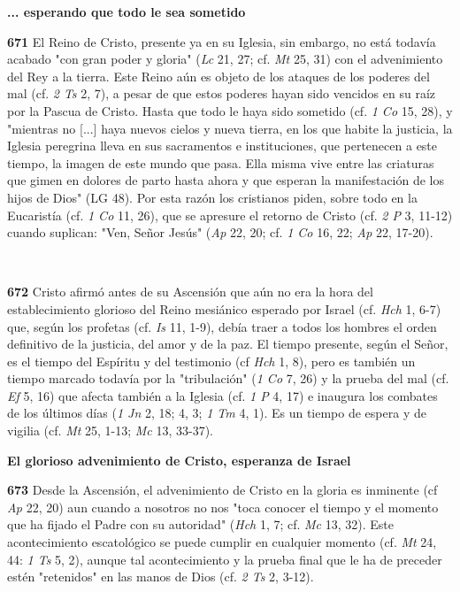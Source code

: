\textbf{... esperando que todo le sea sometido}

\textbf{671} El Reino de Cristo, presente ya en su Iglesia, sin embargo, no está todavía acabado "con gran poder y gloria" (\emph{Lc} 21, 27; cf. \emph{Mt} 25, 31) con el advenimiento del Rey a la tierra. Este Reino aún es objeto de los ataques de los poderes del mal (cf. \emph{2 Ts} 2, 7), a pesar de que estos poderes hayan sido vencidos en su raíz por la Pascua de Cristo. Hasta que todo le haya sido sometido (cf. \emph{1 Co} 15, 28), y "mientras no {[}...{]} haya nuevos cielos y nueva tierra, en los que habite la justicia, la Iglesia peregrina lleva en sus sacramentos e instituciones, que pertenecen a este tiempo, la imagen de este mundo que pasa. Ella misma vive entre las criaturas que gimen en dolores de parto hasta ahora y que esperan la manifestación de los hijos de Dios" (LG 48). Por esta razón los cristianos piden, sobre todo en la Eucaristía (cf. \emph{1 Co} 11, 26), que se apresure el retorno de Cristo (cf. \emph{2 P} 3, 11-12) cuando suplican: "Ven, Señor Jesús" (\emph{Ap} 22, 20; cf. \emph{1 Co} 16, 22; \emph{Ap} 22, 17-20).

\textbf{\\ }

\textbf{672} Cristo afirmó antes de su Ascensión que aún no era la hora del establecimiento glorioso del Reino mesiánico esperado por Israel (cf. \emph{Hch} 1, 6-7) que, según los profetas (cf. \emph{Is} 11, 1-9), debía traer a todos los hombres el orden definitivo de la justicia, del amor y de la paz. El tiempo presente, según el Señor, es el tiempo del Espíritu y del testimonio (cf \emph{Hch} 1, 8), pero es también un tiempo marcado todavía por la "tribulación" (\emph{1 Co} 7, 26) y la prueba del mal (cf. \emph{Ef} 5, 16) que afecta también a la Iglesia (cf. \emph{1 P} 4, 17) e inaugura los combates de los últimos días (\emph{1 Jn} 2, 18; 4, 3; \emph{1 Tm} 4, 1). Es un tiempo de espera y de vigilia (cf. \emph{Mt} 25, 1-13; \emph{Mc} 13, 33-37).

\textbf{El glorioso advenimiento de Cristo, esperanza de Israel}

\textbf{673} Desde la Ascensión, el advenimiento de Cristo en la gloria es inminente (cf \emph{Ap} 22, 20) aun cuando a nosotros no nos "toca conocer el tiempo y el momento que ha fijado el Padre con su autoridad" (\emph{Hch} 1, 7; cf. \emph{Mc} 13, 32). Este acontecimiento escatológico se puede cumplir en cualquier momento (cf. \emph{Mt} 24, 44: \emph{1 Ts} 5, 2), aunque tal acontecimiento y la prueba final que le ha de preceder estén "retenidos" en las manos de Dios (cf. \emph{2 	Ts} 2, 3-12).

